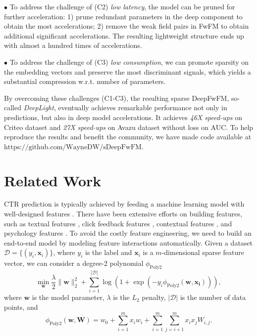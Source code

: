 \documentclass[sigconf]{acmart}
\begin{document}
$\bullet$ To address the challenge of (C2) \emph{low latency}, the model can be pruned for further acceleration: 1) prune redundant parameters in the deep component to obtain the most accelerations; 2) remove the weak field pairs in FwFM to obtain additional significant accelerations. The resulting lightweight structure ends up with almost a hundred times of accelerations.



$\bullet$ To address the challenge of (C3) \emph{low consumption}, we can promote sparsity on the embedding vectors and preserve the most discriminant signals, which yields a substantial compression w.r.t. number of parameters.

By overcoming these challenges (C1-C3), the resulting sparse DeepFwFM, so-called \emph{DeepLight}, eventually achieves remarkable performance not only in predictions, but also in deep
model accelerations. It achieves \emph{46X speed-ups} on Criteo dataset and \emph{27X speed-ups} on
Avazu dataset without loss on AUC. To help reproduce the results and benefit the community, we have made code available at $\text{https://github.com/WayneDW/sDeepFwFM}$.




 


\section{Related Work}

CTR prediction is typically achieved by feeding a machine learning model with well-designed features \cite{Xinran_He, linear1}. There
have been extensive efforts on building features, such as textual
features \cite{Shaparenko}, click feedback features \cite{Graepel}, contextual features \cite{linear1}, and psychology features \cite{Taifeng}. To avoid the costly feature engineering, we need to build an end-to-end model by modeling feature interactions automatically. Given a dataset $\mathcal{D}=\{(y_i, \bm{x}_i)\}$, where $y_i$ is the label and $\bm{x}_i$ is a $m$-dimensional sparse feature vector, we can consider a degree-2 polynomial $\phi_{\text{Poly2}}$
\begin{equation}
    \label{logit}
    \min_{\bm{w}} \frac{\lambda}{2} \|\bm{w}\|_2^2 + \sum_{i=1}^{|\mathcal{D}|} \log(1+\exp(-y_i \phi_{\text{Poly2}}(\bm{w}, \bm{x_i}))),
\end{equation}
where $\bm{w}$ is the model parameter, $\lambda$ is the $L_2$ penalty, $|\mathcal{D}|$ is the number of data points, and 
\begin{equation}
\label{poly2}
        \phi_{\text{Poly2}}(\bm{w}, \bm{W})=w_0+\sum_{i=1}^m x_i w_i+\sum_{i=1}^m\sum_{j=i+1}^m x_i x_j W_{i,j}.
\end{equation}
\end{document}
